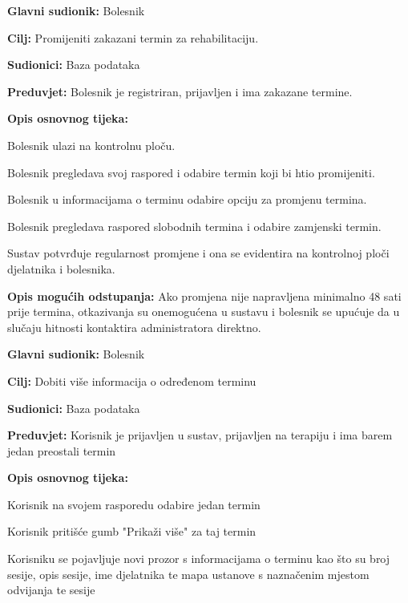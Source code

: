 	\item \textbf{Glavni sudionik:} Bolesnik
	\item \textbf{Cilj:} Promijeniti zakazani termin za rehabilitaciju.
	\item \textbf{Sudionici:} Baza podataka
	\item \textbf{Preduvjet:} Bolesnik je registriran, prijavljen i ima zakazane termine.
	\item \textbf{Opis osnovnog tijeka:}
	\begin{packed_enum}
        	\item Bolesnik ulazi na kontrolnu ploču.
	 	\item Bolesnik pregledava svoj raspored i odabire termin koji bi htio promijeniti.
		\item Bolesnik u informacijama o terminu odabire opciju za promjenu termina.
		\item Bolesnik pregledava raspored slobodnih termina i odabire zamjenski termin.
		\item Sustav potvrđuje regularnost promjene i ona se evidentira na kontrolnoj ploči djelatnika i bolesnika. 
	\end{packed_enum}
    	\item \textbf{Opis mogućih odstupanja:}
		Ako promjena nije napravljena minimalno 48 sati prije termina, otkazivanja su onemogućena u sustavu i bolesnik se upućuje da u slučaju hitnosti kontaktira administratora direktno. 
\closeusecase


	\item \textbf{Glavni sudionik:} Bolesnik
 	\item \textbf{Cilj:} Dobiti više informacija o određenom terminu
  	\item \textbf{Sudionici:} Baza podataka
   	\item \textbf{Preduvjet:} Korisnik je prijavljen u sustav, prijavljen na terapiju i ima barem jedan preostali termin
    	\item \textbf{Opis osnovnog tijeka:}
     	\begin{packed_enum}
      		\item Korisnik na svojem rasporedu odabire jedan termin
		\item Korisnik pritišće gumb "Prikaži više" za taj termin
  		\item Korisniku se pojavljuje novi prozor s informacijama o terminu kao što su broj sesije, opis sesije, ime djelatnika te mapa ustanove s naznačenim mjestom odvijanja te sesije
    	\end{packed_enum}
\closeusecase


